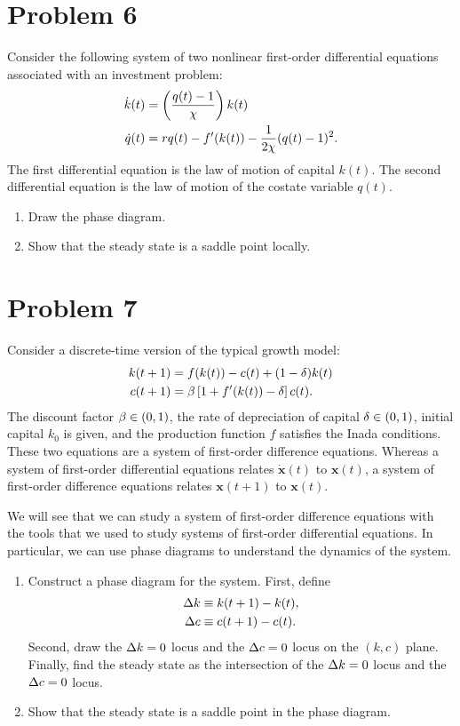 \documentclass[letterpaper, 11pt, leqno]{article}
\begin{document}
\section*{Problem 6}

Consider the following system of two nonlinear first-order differential equations associated with an investment problem:
\begin{align*}
\dot{k}(t) &=\left( \frac{q(t)-1}{\chi} \right) k(t) \\
\dot{q}(t) &=r q(t)-f'(k(t)) -\frac{1}{2 \chi} (q(t)-1)^{2}.
\end{align*}
The first differential equation is the law of motion of capital $k(t)$. The second differential equation is the law of motion of the costate variable $q(t)$.

\begin{enumerate}
\item Draw the phase diagram.
\item Show that the steady state is a saddle point locally.
\end{enumerate}

\section*{Problem 7}

Consider a discrete-time version of the typical growth model:
\begin{align*}
k(t+1) &=f(k(t)) -c(t) + (1-\delta) k(t) \\
c(t+1) &=\beta \left[ 1+f'(k(t)) -\delta \right] c(t) .
\end{align*} 
The discount factor $\beta \in (0,1)$, the rate of depreciation of capital $\delta \in (0,1)$, initial capital $k_{0}$ is given, and the production function $f$ satisfies the Inada conditions. These two equations are a system of first-order difference equations. Whereas a system of first-order differential equations relates $\dot{\bm{x}}(t) $ to $\bm{x}(t)$, a system of first-order difference equations relates $\bm{x}(t+1)$ to $\bm{x}(t)$.

We will see that we can study a system of first-order difference equations with the tools that we used to study systems of first-order differential equations. In particular, we can use phase diagrams to understand the dynamics of the system.

\begin{enumerate}
\item Construct a phase diagram for the system. First, define 
\begin{align*}
\Delta k & \equiv k(t+1) -k(t), \\
\Delta c & \equiv c(t+1) -c(t).
\end{align*}
Second, draw the $\Delta k=0$ locus and the $\Delta c=0$ locus on the $(k,c)$ plane. Finally, find the steady state as the intersection of the $\Delta k=0$ locus and the $ \Delta c=0$ locus.
\item Show that the steady state is a saddle point in the phase diagram.
\end{enumerate}
\end{document}
